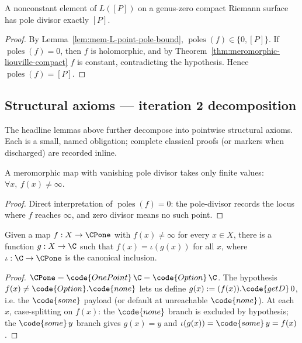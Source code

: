 \begin{theorem}
\label{thm:genus-zero-pole-identification}
A nonconstant element of \(L([P])\) on a genus-zero compact Riemann
surface has pole divisor exactly \([P]\).
\leanok
\end{theorem}
\begin{proof}
\leanok
By Lemma~\ref{lem:mem-L-point-pole-bound}, \(\operatorname{poles}(f)\in\{0,[P]\}\).
If \(\operatorname{poles}(f)=0\), then \(f\) is holomorphic, and by
Theorem~\ref{thm:meromorphic-liouville-compact} \(f\) is constant,
contradicting the hypothesis.  Hence \(\operatorname{poles}(f)=[P]\).
\end{proof}

\subsection{Structural axioms --- iteration 2 decomposition}
\label{sec:rr-structural-iter2}

The headline lemmas above further decompose into pointwise structural
axioms. Each is a small, named obligation; complete classical proofs
(or  markers when discharged) are recorded inline.

\begin{lemma}
\label{lem:meromorphic-no-infty-of-no-poles}
A meromorphic map with vanishing pole divisor takes only finite
values: \(\forall x,\ f(x)\neq\infty\).
\leanok
\end{lemma}
\begin{proof}
\leanok
Direct interpretation of \(\operatorname{poles}(f)=0\): the pole-divisor records
the locus where \(f\) reaches \(\infty\), and zero divisor means no
such point.
\end{proof}

\begin{lemma}
\label{lem:onepoint-lift-of-no-infty}
Given a map \(f:X\to\CPone\) with \(f(x)\neq\infty\) for every
\(x\in X\), there is a function \(g:X\to\C\) such that
\(f(x)=\iota(g(x))\) for all \(x\), where \(\iota:\C\to\CPone\) is
the canonical inclusion.

\end{lemma}
\begin{proof}

\(\CPone=\code{OnePoint}\,\C=\code{Option}\,\C\). The hypothesis
\(f(x)\neq\code{Option}.\code{none}\) lets us define \(g(x):=(f(x)).\code{getD}\,0\),
i.e. the \(\code{some}\) payload (or default at unreachable \(\code{none}\)). At
each \(x\), case-splitting on \(f(x)\): the \(\code{none}\) branch is
excluded by hypothesis; the \(\code{some}\,y\) branch gives
\(g(x)=y\) and \(\iota(g(x))=\code{some}\,y=f(x)\).
\end{proof}

